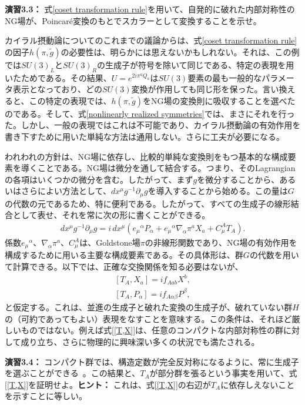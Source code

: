 %
\begin{eBox}
%
{\bf 演習3.3：} 式\eqref{coset transformation rule}を用いて、自発的に破れた内部対称性のNG場が、Poincar\'e変換のもとでスカラーとして変換することを示せ。
%
\end{eBox}
%

カイラル摂動論についてのこれまでの議論からは、式\eqref{coset transformation rule}の因子$h(\pi, \tilde g)$の必要性は、明らかには思えないかもしれない。それは、この例では$SU(3)_L$と$SU(3)_R$の生成子が符号を除いて同じである、特定の表現を用いたためである。その結果、$U = e^{2 i \pi^a Q_a}$は$SU(3)$要素の最も一般的なパラメータ表示となっており、どの$SU(3)$変換が作用しても同じ形を保った。言い換えると、この特定の表現では、$h(\pi, \tilde g)$をNG場の変換則に吸収することを選べたのである。そして、式\eqref{nonlinearly realized symmetries}では、まさにそれを行った。しかし、一般の表現ではこれは不可能であり、カイラル摂動論の有効作用を書き下すために用いた単純な方法は通用しない。さらに工夫が必要になる。

われわれの方針は、NG場に依存し、比較的単純な変換則をもつ基本的な構成要素を導くことである。NG場は微分を通して結合する。つまり、そのLagrangianの各項はいくつかの微分を含む。したがって、まず$g$を微分することから、あるいはさらによい方法として、$ dx^\mu g^{-1} \partial_\mu g $を導入することから始める。この量は$G$の代数の元であるため、特に便利である。したがって、すべての生成子の線形結合として表せ、それを常に次の形に書くことができる。
%
\begin{align} \label{MC form}
	dx^\mu  g^{-1} \partial_\mu g = i\, dx^\mu \left(  e_\mu{}^\alpha P_\alpha + e_\mu{}^\alpha \nabla_\alpha \pi^a X_a + C_\mu^A T_A \right) .
\end{align}
%
係数$e_\mu{}^\alpha$、$\nabla_\alpha \pi^a$、$C_\mu^A$は、Goldstone場$\pi$の非線形関数であり、NG場の有効作用を構成するために用いる主要な構成要素である。その具体形は、群$G$の代数を用いて計算できる。以下では、正確な交換関係を知る必要はないが、
%
\begin{subequations} \label{assumptions re commutators}
\begin{align}
	[T_A, X_a] = i f_{Aab} X^b , \label{[T,X]} \\
	[T_A, P_\alpha] = i f_{A\alpha\beta} P^\beta ,
\end{align}
\end{subequations}
%
と仮定する。これは、並進の生成子と破れた変換の生成子が、破れていない群$H$の（可約であってもよい）表現をなすことを意味する。この条件は、それほど厳しいものではない。例えば式\eqref{[T,X]}は、任意のコンパクトな内部対称性の群に対して成り立ち、さらに物理的に興味深い多くの状況でも満たされる。
%
\begin{eBox}
%
{\bf 演習3.4：} コンパクト群では、構造定数が完全反対称になるように、常に生成子を選ぶことができる~\cite{Weinberg:1996kr}。この結果と、$T_A$が部分群を張るという事実を用いて、式\eqref{[T,X]}を証明せよ。{\bf ヒント：} これは、式\eqref{[T,X]}の右辺が$T_A$に依存しえないことを示すことに等しい。
%
\end{eBox}
%

